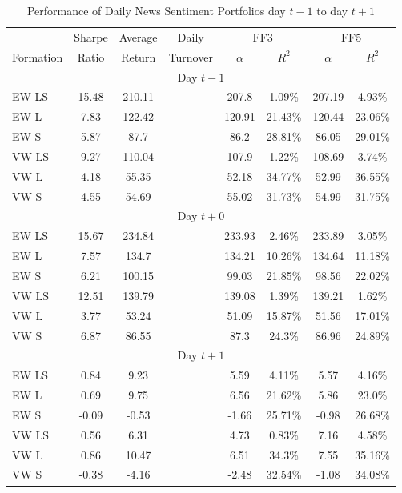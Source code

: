 \begin{table}[!t]
\begin{center}
\begin{tabular}{lccccccc}
      \toprule
      & Sharpe &  Average & Daily & \multicolumn{2}{c}{FF3} & \multicolumn{2}{c}{FF5} \\
      \cmidrule(lr){5-6}
      \cmidrule(lr){7-8}
      Formation & Ratio & Return & Turnover & $\alpha$ & $R^2$ & $\alpha$ & $R^2$ \\
      \midrule
      \multicolumn{8}{c}{Day $t-1$} \\
EW LS & 15.48 & 210.11 & & 207.8 & 1.09\% & 207.19 & 4.93\% \\
EW L & 7.83 & 122.42 & & 120.91 & 21.43\% & 120.44 & 23.06\% \\
EW S & 5.87 & 87.7 & & 86.2 & 28.81\% & 86.05 & 29.01\% \\
VW LS & 9.27 & 110.04 & & 107.9 & 1.22\% & 108.69 & 3.74\% \\
VW L & 4.18 & 55.35 & & 52.18 & 34.77\% & 52.99 & 36.55\% \\
VW S & 4.55 & 54.69 & & 55.02 & 31.73\% & 54.99 & 31.75\% \\
      \multicolumn{8}{c}{Day $t+0$} \\
EW LS & 15.67 & 234.84 & & 233.93 & 2.46\% & 233.89 & 3.05\% \\
EW L & 7.57 & 134.7 & & 134.21 & 10.26\% & 134.64 & 11.18\% \\
EW S & 6.21 & 100.15 & & 99.03 & 21.85\% & 98.56 & 22.02\% \\
VW LS & 12.51 & 139.79 & & 139.08 & 1.39\% & 139.21 & 1.62\% \\
VW L & 3.77 & 53.24 & & 51.09 & 15.87\% & 51.56 & 17.01\% \\
VW S & 6.87 & 86.55 & & 87.3 & 24.3\% & 86.96 & 24.89\% \\
      \multicolumn{8}{c}{Day $t+1$} \\
EW LS & 0.84 & 9.23 & & 5.59 & 4.11\% & 5.57 & 4.16\% \\
EW L & 0.69 & 9.75 & & 6.56 & 21.62\% & 5.86 & 23.0\% \\
EW S & -0.09 & -0.53 & & -1.66 & 25.71\% & -0.98 & 26.68\% \\
VW LS & 0.56 & 6.31 & & 4.73 & 0.83\% & 7.16 & 4.58\% \\
VW L & 0.86 & 10.47 & & 6.51 & 34.3\% & 7.55 & 35.16\% \\
VW S & -0.38 & -4.16 & & -2.48 & 32.54\% & -1.08 & 34.08\% \\
      \bottomrule
\end{tabular}
\caption{Performance of Daily News Sentiment Portfolios day $t-1$ to day $t+1$}
\label{portfolio-performance-day-1}
\end{center}
\end{table}

